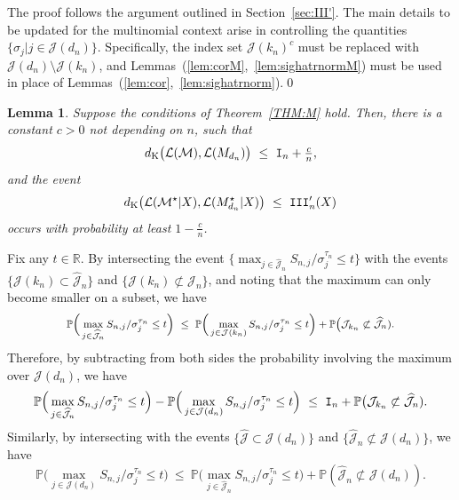 \documentclass[aos,preprint]{imsart}
\numberwithin{equation}{section}
\theoremstyle{plain}
\newtheorem{lemma}{Lemma}[section]
\newcommand{\M}{\mathcal{M}}
\newcommand{\R}{\mathbb{R}}
\renewcommand{\hat}[1]{\widehat{#1}}
\newcommand{\bI}{\textup{\texttt{I}}}
\newcommand{\bIII}{\textup{\texttt{III}}}
\newcommand{\J}{\mathcal{J}}
\renewcommand{\P}{\mathbb{P}}
\renewcommand{\L}{\mathcal{L}}
\newcommand{\ts}{\textstyle}
\newcommand{\1}{{\bf{1}}}
\newcommand{\0}{\mathbf{0}}
\begin{document}
\proof The proof follows the argument outlined in Section~\ref{sec:III'}. The main details to be updated for the multinomial context arise in controlling the quantities $\{\hat\sigma_j | j\in\J(d_n)\}$. Specifically, the index set $\J(k_n)^c$ must be replaced with  $\J(d_n)\setminus \J(k_n)$, and Lemmas~(\ref{lem:corM},~\ref{lem:sighatrnormM}) must be used in place of Lemmas~(\ref{lem:cor},~\ref{lem:sighatrnorm}).\qed



\begin{lemma}\label{lem:otherM}
Suppose the conditions of Theorem~\ref{THM:M} hold. Then, there is a constant $c>0$ not depending on $n$, such that
\begin{equation}\label{eqn:reductionfirst}
 d_{\textup{K}}\big(\L(\M), \L(M_{d_n})\big) \ \leq \ \bI_n+\ts\frac{c}{n},
\end{equation}
and the event
\begin{equation}\label{eqn:reductionsecond}
  d_{\textup{K}}\big(\L(\M^{\star}|X), \L(M_{d_n}^{\star}|X)\big) \ \leq \   \bIII_n'(X) 
\end{equation}
occurs with probability at least $1-\frac cn$.
\end{lemma}
%
%
%
%
%
%
%
%
%
\proof Fix any $t\in\R$. By intersecting the event $\{\max_{j\in\hat\J_n}S_{n,j}/\sigma_j^{\tau_n}\leq t\}$ with the events $\{\J(k_n)\subset \hat\J_n\}$ and $\{\J(k_n)\not \subset\hat\J_n\}$, and noting that the maximum can only become smaller on a subset, we have
\begin{equation*}
\footnotesize
\begin{split}
\P\Big(\max_{j\in\hat\J_n}S_{n,j}/\sigma_j^{\tau_n}\leq t\Big) \ \leq \
%
 \P\Big(\max_{j\in\J(k_n)}S_{n,j}/\sigma_j^{\tau_n}\leq t\Big) +\P\big(\J_{k_n}\not\subset\hat\J_n).
\end{split}
\end{equation*}
Therefore, by subtracting from both sides the probability involving the maximum over $\J(d_n)$, we have
\footnotesize
\begin{equation}\label{eqn:firstsign}
 \P\Big(\max_{j\in\hat\J_n}S_{n,j}/\sigma_j^{\tau_n}\leq t\Big) - \P\Big(\max_{j\in\J(d_n)}S_{n,j}/\sigma_j^{\tau_n}\leq t\Big) \ \leq \ \bI_n+\P\big(\J_{k_n}\not\subset\hat\J_n).
\end{equation}
\normalsize
%
Similarly, by intersecting with the events $\{\hat\J\subset \J(d_n)\}$ and $\{\hat\J_n\not \subset\J(d_n)\}$, we have
\footnotesize
\begin{equation*}
\P\Big(\max_{j\in\J(d_n)}S_{n,j}/\sigma_j^{\tau_n}\leq t\Big) 
 \ \leq \  \P\Big(\max_{j\in\hat\J_n}S_{n,j}/\sigma_j^{\tau_n}\leq t\Big)+ \P(\hat\J_n\not \subset\J(d_n)).
\end{equation*}
\end{document}
